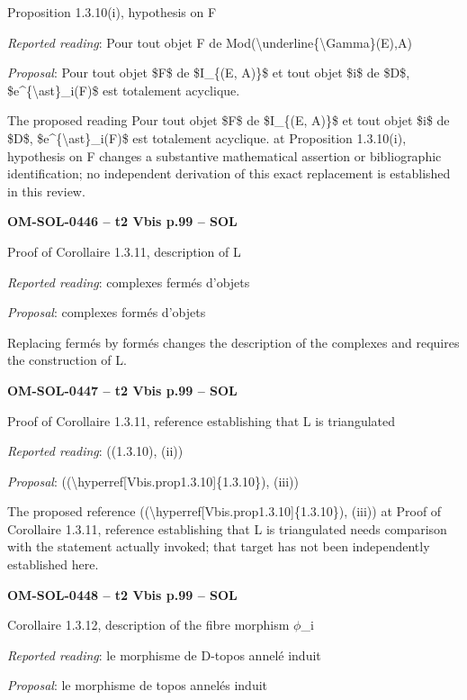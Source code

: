 Proposition 1.3.10(i), hypothesis on F\par
\emph{Reported reading}: Pour tout objet F de Mod(\textbackslash{}underline\{\textbackslash{}Gamma\}(E),A)\par
\emph{Proposal}: Pour tout objet \$F\$ de \$I\_\{(E, A)\}\$ et tout objet \$i\$ de \$D\$, \$e\textasciicircum{}\{\textbackslash{}ast\}\_i(F)\$ est totalement acyclique.\par
The proposed reading Pour tout objet \$F\$ de \$I\_\{(E, A)\}\$ et tout objet \$i\$ de \$D\$, \$e\textasciicircum{}\{\textbackslash{}ast\}\_i(F)\$ est totalement acyclique. at Proposition 1.3.10(i), hypothesis on F changes a substantive mathematical assertion or bibliographic identification; no independent derivation of this exact replacement is established in this review.\par
\par\noindent\textbf{OM-SOL-0446 -- t2 Vbis p.99 -- SOL}\par
Proof of Corollaire 1.3.11, description of L\par
\emph{Reported reading}: complexes fermés d'objets\par
\emph{Proposal}: complexes formés d'objets\par
Replacing fermés by formés changes the description of the complexes and requires the construction of L.\par
\par\noindent\textbf{OM-SOL-0447 -- t2 Vbis p.99 -- SOL}\par
Proof of Corollaire 1.3.11, reference establishing that L is triangulated\par
\emph{Reported reading}: ((1.3.10), (ii))\par
\emph{Proposal}: ((\textbackslash{}hyperref[Vbis.prop1.3.10]\{1.3.10\}), (iii))\par
The proposed reference ((\textbackslash{}hyperref[Vbis.prop1.3.10]\{1.3.10\}), (iii)) at Proof of Corollaire 1.3.11, reference establishing that L is triangulated needs comparison with the statement actually invoked; that target has not been independently established here.\par
\par\noindent\textbf{OM-SOL-0448 -- t2 Vbis p.99 -- SOL}\par
Corollaire 1.3.12, description of the fibre morphism \ensuremath{\phi}\_i\par
\emph{Reported reading}: le morphisme de D-topos annelé induit\par
\emph{Proposal}: le morphisme de topos annelés induit\par
